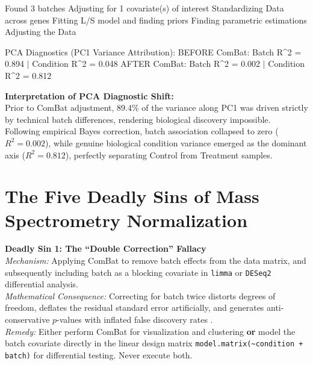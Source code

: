 \documentclass[11pt,oneside]{book}
\begin{document}
\begin{routput}
Found 3 batches
Adjusting for 1 covariate(s) of interest
Standardizing Data across genes
Fitting L/S model and finding priors
Finding parametric estimations
Adjusting the Data

PCA Diagnostics (PC1 Variance Attribution):
BEFORE ComBat: Batch R\textasciicircum 2 = 0.894 $|$ Condition R\textasciicircum 2 = 0.048
AFTER  ComBat: Batch R\textasciicircum 2 = 0.002 $|$ Condition R\textasciicircum 2 = 0.812
\end{routput}

\begin{biologicalinsight}
\textbf{Interpretation of PCA Diagnostic Shift:}\\
Prior to ComBat adjustment, 89.4\% of the variance along PC1 was driven strictly by technical batch differences, rendering biological discovery impossible. Following empirical Bayes correction, batch association collapsed to zero ($R^2 = 0.002$), while genuine biological condition variance emerged as the dominant axis ($R^2 = 0.812$), perfectly separating Control from Treatment samples.
\end{biologicalinsight}

\section{The Five Deadly Sins of Mass Spectrometry Normalization}

\begin{pitfallbox}
\textbf{Deadly Sin 1: The ``Double Correction'' Fallacy}\\
\textit{Mechanism:} Applying ComBat to remove batch effects from the data matrix, and subsequently including batch as a blocking covariate in \texttt{limma} or \texttt{DESeq2} differential analysis.\\
\textit{Mathematical Consequence:} Correcting for batch twice distorts degrees of freedom, deflates the residual standard error artificially, and generates anti-conservative $p$-values with inflated false discovery rates \cite{nygaard2016methods}.\\
\textit{Remedy:} Either perform ComBat for visualization and clustering \textbf{or} model the batch covariate directly in the linear design matrix \texttt{model.matrix(\textasciitilde condition + batch)} for differential testing. Never execute both.
\end{pitfallbox}
\end{document}
